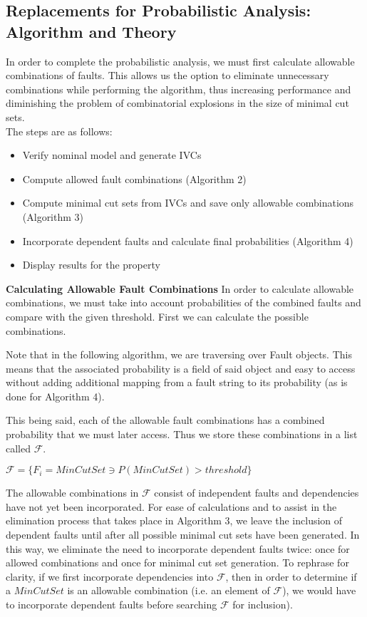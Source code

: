 \subsection{Replacements for Probabilistic Analysis: Algorithm and Theory}
In order to complete the probabilistic analysis, we must first calculate allowable combinations of faults. This allows us the option to eliminate unnecessary combinations while performing the algorithm, thus increasing performance and diminishing the problem of combinatorial explosions in the size of minimal cut sets. \\

The steps are as follows:\\
\begin{itemize}
\item Verify nominal model and generate IVCs
\item Compute allowed fault combinations (Algorithm 2)
\item Compute minimal cut sets from IVCs and save only allowable combinations (Algorithm 3)
\item Incorporate dependent faults and calculate final probabilities (Algorithm 4)
\item Display results for the property
\end{itemize}

\textbf{Calculating Allowable Fault Combinations}
In order to calculate allowable combinations, we must take into account probabilities of the combined faults and compare with the given threshold. First we can calculate the possible combinations.

Note that in the following algorithm, we are traversing over Fault objects. This means that the associated probability is a field of said object and easy to access without adding additional mapping from a fault string to its probability (as is done for Algorithm 4). 

This being said, each of the allowable fault combinations has a combined probability that we must later access. Thus we store these combinations in a list called $\mathcal{F}$.

$\mathcal{F} = \{F_i = MinCutSet \ni P(MinCutSet) > threshold\}$

The allowable combinations in $\mathcal{F}$ consist of independent faults and dependencies have not yet been incorporated. For ease of calculations and to assist in the elimination process  that takes place in Algorithm 3, we leave the inclusion of dependent faults until after all possible minimal cut sets have been generated. In this way, we eliminate the need to incorporate dependent faults twice: once for allowed combinations and once for minimal cut set generation. To rephrase for clarity, if we first incorporate dependencies into $\mathcal{F}$, then in order to determine if a $MinCutSet$ is an allowable combination (i.e. an element of $\mathcal{F}$), we would have to incorporate dependent faults before searching $\mathcal{F}$ for inclusion). \\

